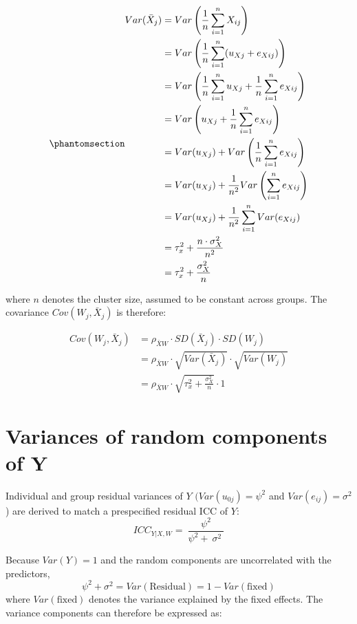 \documentclass[
  letterpaper,
  11pt,
  english,
  singlespacing,
  headsepline,
  openany]{MastersDoctoralThesis}
\begin{document}
\begin{equation}\phantomsection\label{eq-varxbar}{
\begin{aligned}
Var(\bar{X}_j)
&= Var\left( \frac{1}{n} \sum_{i=1}^{n} X_{ij} \right) \\
&= Var\left( \frac{1}{n} \sum_{i=1}^{n} (u_{Xj} + e_{Xij}) \right) \\
&= Var\left( \frac{1}{n} \sum_{i=1}^{n} u_{Xj} 
+ \frac{1}{n} \sum_{i=1}^{n} e_{Xij} \right) \\
&= Var\left( u_{Xj} + \frac{1}{n} \sum_{i=1}^{n} e_{Xij} \right) \\
&= Var(u_{Xj}) 
+ Var\left( \frac{1}{n} \sum_{i=1}^{n} e_{Xij} \right) \\
&= Var(u_{Xj}) 
+ \frac{1}{n^2} Var\left( \sum_{i=1}^{n} e_{Xij} \right) \\
&= Var(u_{Xj}) 
+ \frac{1}{n^2} \sum_{i=1}^{n} Var(e_{Xij}) \\
&= \tau_x^2 + \frac{n \cdot \sigma_X^2}{n^2} \\
&= \tau_x^2 + \frac{\sigma_X^2}{n}
\end{aligned}
}\end{equation}

where \(n\) denotes the cluster size, assumed to be constant across
groups. The covariance \(Cov(W_j, \bar{X}_j)\) is therefore:

\[
\begin{aligned}
Cov(W_j, \bar{X}_j)
&= \rho_{\bar{X}W} \cdot SD(\bar{X}_j) \cdot SD(W_j) \\
&= \rho_{\bar{X}W} \cdot \sqrt{Var(\bar{X}_j)} \cdot \sqrt{Var(W_j)} \\
&= \rho_{\bar{X}W} \cdot \sqrt{\tau_x^2 + \frac{\sigma_X^2}{n}} \cdot 1
\end{aligned}
\]

\section{Variances of random components of Y}\label{sec-randomy}

Individual and group residual variances of \(Y\)
\((Var\left(u_{0j}\right) = \psi^2\) and \(Var(e_{ij}) = \sigma^2\)) are
derived to match a prespecified residual ICC of \(Y\):
\[ICC_{Y|X,W}=\ \frac{\psi^2}{\psi^2+\ \sigma^2\ }\]

Because \(Var(Y)=1\) and the random components are uncorrelated with the
predictors, \[
\psi^2 + \sigma^2 = Var(\text{Residual}) = 1 - Var(\text{fixed})
\] where \(Var(\text{fixed})\) denotes the variance explained by the
fixed effects. The variance components can therefore be expressed as:
\end{document}
